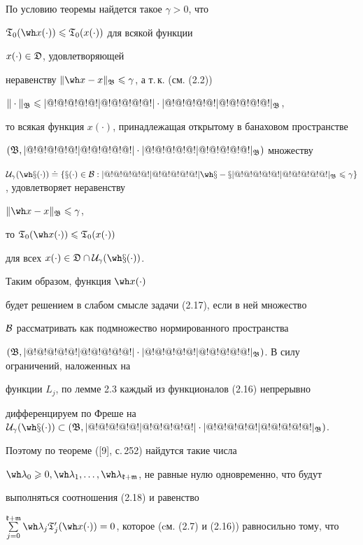 \begin{pf}


По условию теоремы найдется такое $\gamma>0$, что


$\frak T_0(\wh x(\cdot))\leqslant\frak T_0(x(\cdot))$ для всякой функции


$x(\cdot)\in\frak D$, удовлетворяющей


неравенству $\|\wh x-x\|_{\frak B}\leqslant\gamma$, а т.\,к. (см. (2.2))


$\|\cdot\|_{\frak B}\leqslant|@!@!@!@!@!|@!@!@!@!@!|\cdot|@!@!@!@!@!|@!@!@!@!@!|_{\frak B}$,


то всякая функция $x(\cdot)$, принадлежащая открытому в банаховом пространстве


$(\frak B,|@!@!@!@!@!|@!@!@!@!@!|\cdot|@!@!@!@!@!|@!@!@!@!@!|_{\frak B})$ множеству


$\cal U_{\gamma}(\wh x(\cdot))\doteq


\{x(\cdot)\in\cal B:\tri\wh


x-x\tri_{\frak B}\leqslant\gamma\}$, удовлетворяет неравенству


$\|\wh x-x\|_{\frak B}\leqslant\gamma$,


то $\frak T_0(\wh x(\cdot))\leqslant\frak T_0(x(\cdot))$


для всех $x(\cdot)\in\frak D\cap\cal U_\gamma(\wh x(\cdot))$.


Таким образом, функция $\wh x(\cdot)$


будет решением в слабом смысле задачи (2.17), если в ней множество


$\cal B$ рассматривать как подмножество нормированного пространства


$(\frak B,|@!@!@!@!@!|@!@!@!@!@!|\cdot|@!@!@!@!@!|@!@!@!@!@!|_{\frak B})$. В силу ограничений, наложенных на


функции $L_j$, по лемме 2.3 каждый из функционалов (2.16) непрерывно


дифференцируем по Фреше на $\cal U_\gamma(\wh


x(\cdot))\subset(\frak B,\tri\cdot\tri_{\frak B})$.


Поэтому по теореме ([9], с.\,252) найдутся такие числа


$\wh\lambda_{0}\geqslant0,\wh\lambda_{1},


\dotsc,\wh\lambda_{\frak k+\frak m}$, не равные нулю одновременно, что будут


выполняться соотношения (2.18) и равенство


$\sum\limits_{j=0}^{\frak k+\frak m}\wh\lambda_j\frak T'_j(\wh


x(\cdot))=0$, которое (cм. (2.7) и (2.16)) равносильно тому, что



\end{pf}
